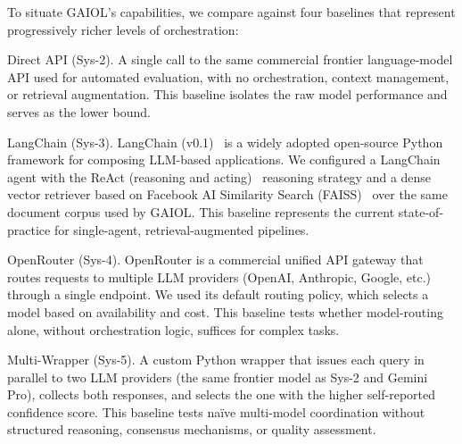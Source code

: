 \documentclass{iopjournal}
\begin{document}
To situate GAIOL's capabilities, we compare against four baselines that represent progressively richer levels of orchestration:

Direct API (Sys-2). A single call to the same commercial frontier language-model API used for automated evaluation, with no orchestration, context management, or retrieval augmentation. This baseline isolates the raw model performance and serves as the lower bound.

LangChain (Sys-3). LangChain (v0.1)~\cite{LangChain} is a widely adopted open-source Python framework for composing LLM-based applications. We configured a LangChain agent with the ReAct (reasoning and acting)~\cite{ReAct} reasoning strategy and a dense vector retriever based on Facebook AI Similarity Search (FAISS)~\cite{DPR} over the same document corpus used by GAIOL. This baseline represents the current state-of-practice for single-agent, retrieval-augmented pipelines.

OpenRouter (Sys-4). OpenRouter is a commercial unified API gateway that routes requests to multiple LLM providers (OpenAI, Anthropic, Google, etc.) through a single endpoint. We used its default routing policy, which selects a model based on availability and cost. This baseline tests whether model-routing alone, without orchestration logic, suffices for complex tasks.

Multi-Wrapper (Sys-5). A custom Python wrapper that issues each query in parallel to two LLM providers (the same frontier model as Sys-2 and Gemini Pro), collects both responses, and selects the one with the higher self-reported confidence score. This baseline tests na\"ive multi-model coordination without structured reasoning, consensus mechanisms, or quality assessment.
\end{document}
